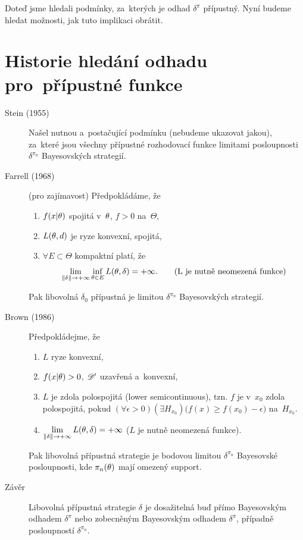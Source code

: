 \begin{remark}
	Doteď jsme hledali podmínky, za~kterých je odhad  $\delta^{\pi}$ přípustný. Nyní budeme hledat možnosti, jak tuto implikaci obrátit.
	\section{Historie hledání odhadu pro~přípustné funkce}
	\begin{description}
		\item[Stein (1955)] Našel nutnou a~postačující podmínku (nebudeme ukazovat jakou), za~které jsou všechny přípustné rozhodovací funkce limitami posloupnosti $\delta^{\pi_n}$ Bayesovských strategií.
		\item[Farrell (1968)] (pro zajímavost) Předpokládáme, že \begin{enumerate}[1)]
			\item $f(x|\theta)$ spojitá v~$\theta$, $f>0$ na~$\Theta$,
			\item $L(\theta,d)$ je ryze konvexní, spojitá,
			\item $\forall E\subset\Theta$ kompaktní platí, že 
			$$ \lim\limits_{\left\|\delta\right\|\to+\infty}\inf\limits_{\theta\in E}L(\theta,\delta)=+\infty.\qquad(\text{L je nutně neomezená funkce})$$ 
		\end{enumerate}
		Pak libovolná $\delta_0$ přípustná je limitou $\delta^{\pi_n}$ Bayesovských strategií.
		\item[Brown (1986)] Předpokládejme, že \begin{enumerate}[1)]
			\item $L$ ryze konvexní,
			\item $f(x|\theta)>0$, $\mathscr{D}' $ uzavřená a~konvexní,
			\item $L$ je zdola polospojitá (lower semicontinuous), tzn. $f$ je v~$x_0$ zdola polospojitá, pokud $(\forall\epsilon>0)(\exists H_{x_0})\big(f(x)\geq f(x_0)-\epsilon\big)$ na~$H_{x_0}$.
			\item $\lim\limits_{\left\|\delta\right\|\to+\infty} L(\theta,\delta)=+\infty$ \hspace{0.2cm} ($L$ je nutně neomezená funkce).
		\end{enumerate}
		Pak libovolná přípustná strategie je bodovou limitou $\delta^{\pi_n}$ Bayesovské posloupnosti, kde $\pi_n(\theta)$ mají omezený support.
		\item[Závěr] Libovolná přípustná strategie $\delta$ je dosažitelná buď přímo Bayesovským odhadem $\delta^\pi$ nebo zobecněným Bayesovským odhadem $\delta^\pi$, případně posloupností $\delta^{\pi_n}$.
	\end{description}
\end{remark}
